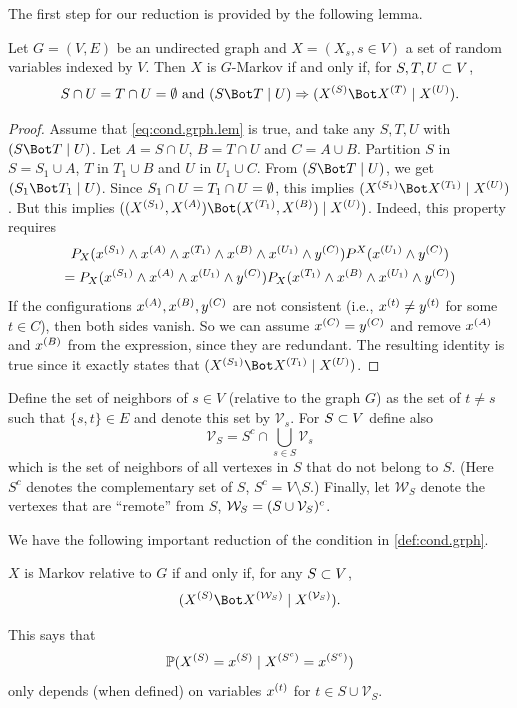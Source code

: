 The first step for our reduction is provided by the following lemma.
\begin{lemma}
\label{lem:int.emp}
Let $G = (V,E)$ be an undirected graph and  $X = (X_s, s\in V)$ a
set of random variables indexed by $V$. Then $X$ is $G$-Markov if and
only if, for $S,T,U\subset V$,
\begin{equation}
\label{eq:cond.grph.lem}
S\cap U = T\cap U=\emp \text{ and }\cind{S}{T}{U} \Rightarrow \cind{\pe X S}{\pe X T}{\pe X U}.
\end{equation}
\end{lemma}
\begin{proof}
Assume that \cref{eq:cond.grph.lem} is true, and take any $S,T,U$ with $\cind{S}{T}{U}$.
Let
$A = S\cap U$, $B = T\cap U$ and $C = A\cup B$. Partition $S$ in $S= S_1\cup
A$, $T$ in $T_1\cup B$ and $U$ in $U_1\cup C$. From 
$\cind{S}{T}{U}$, we get $\cind{S_1}{T_1}{U}$. Since $S_1\cap U = T_1\cap
U = \emptyset$, this implies $\cind{\pe X {S_1}}{\pe X {T_1}}{\pe X U}$. But this implies
$\cind{(\pe X {S_1}, \pe X A)}{(\pe X {T_1}, \pe X B)}{\pe X U}$. Indeed, this property
requires
\begin{multline*}
P_X(x^{(S_1)}\wedge x^{(A)}\wedge x^{(T_1)}\wedge x^{(B)}\wedge x^{(U_1)}\wedge y^{(C)}) P^X(x^{(U_1)}\wedge y^{(C)}) \\
=  P_X(x^{(S_1)}\wedge x^{(A)}\wedge x^{(U_1)}\wedge y^{(C)})P_X(x^{(T_1)}\wedge x^{(B)}\wedge x^{(U_1)}\wedge y^{(C)})
\end{multline*}
If the configurations $x^{(A)}, x^{(B)}, y^{(C)}$ are not consistent (i.e.,
$x^{(t)}\neq y^{(t)}$ for some $t\in C$), then both sides vanish. So we can
assume $x^{(C)} = y^{(C)}$ and remove $x^{(A)}$ and $x^{(B)}$ from the expression,
since they are redundant. The resulting identity is true since it exactly
states that  $\cind{\pe X {S_1}}{\pe X {T_1}}{\pe X U}$.
\end{proof}

Define the set of neighbors of $s\in V$ (relative to the graph $G$) as
the set of $t\neq s$ such that $\{s,t\}\in E$ and denote this set by
$\mathcal V_s$. For $S\subset V$ define also
$$
\mathcal V_S = S^c\cap \bigcup_{s\in S} \mathcal V_s 
$$
which is the set of neighbors of all vertexes in $S$ that do not belong to
$S$. (Here $S^c$ denotes the complementary set of $S$, $S^c = V\setminus
S$.) Finally, let $\mathcal W_S$ denote the vertexes that are ``remote''
from $S$, ${\mathcal W}_S = (S\cup {\mathcal V}_S)^c$.

We have the following important reduction of the condition in  \cref{def:cond.grph}.
\begin{proposition}
\label{prop:mark.prop}
$X$ is Markov relative to $G$ if and only if, for any $S\subset V$,
\begin{equation}
\label{eq:mark.prop}
\cind{\pe X S}{\pe X {\CW_S}}{\pe X {\mathcal V_S}}.
\end{equation}
\end{proposition}
This says that 
$$
\bm{\mathbb P}(X^{(S)} = x^{(S)} \mid X^{(S^c)} = x^{(S^c)})
$$
only depends (when defined) on variables $x^{(t)}$ for $t\in S\cup \mathcal V_S$. 

